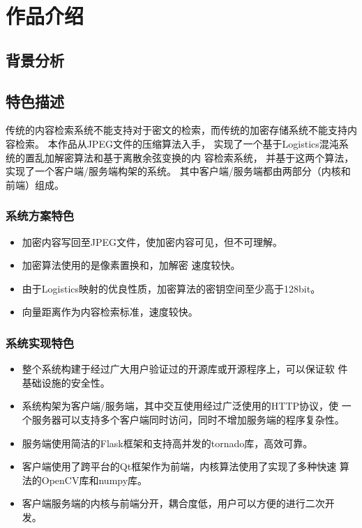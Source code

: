 
\chapter{作品介绍}
\label{chap:intro}

\section{背景分析}
\label{sec:bkg-analysis}

\section{特色描述}
\label{sec:spec-description}
传统的内容检索系统不能支持对于密文的检索，而传统的加密存储系统不能支持内容检索。
本作品从JPEG文件的压缩算法入手，
实现了一个基于Logistics混沌系统的置乱加解密算法和基于离散余弦变换的内
容检索系统，
并基于这两个算法，实现了一个客户端/服务端构架的系统。
其中客户端/服务端都由两部分（内核和前端）组成。

\subsection{系统方案特色}
\label{sec:sys-design-spec}
\begin{itemize}
\item 加密内容写回至JPEG文件，使加密内容可见，但不可理解。
\item 加密算法使用的是像素置换和，加解密  速度较快。
\item 由于Logistics映射的优良性质\cite{li2011}，加密算法的密钥空间至少高于128bit。
\item 向量距离作为内容检索标准，速度较快。
\end{itemize}

\subsection{系统实现特色}
\label{sec:sys-impl-spec}
\begin{itemize}
\item 整个系统构建于经过广大用户验证过的开源库或开源程序上，可以保证软
件基础设施的安全性。
\item 系统构架为客户端/服务端，其中交互使用经过广泛使用的HTTP协议，使
一个服务器可以支持多个客户端同时访问，同时不增加服务端的程序复杂性。
\item 服务端使用简洁的Flask框架和支持高并发的tornado库，高效可靠。
\item 客户端使用了跨平台的Qt框架作为前端，内核算法使用了实现了多种快速
算法的OpenCV库和numpy库。
\item 客户端服务端的内核与前端分开，耦合度低，用户可以方便的进行二次开
发。
\end{itemize}


